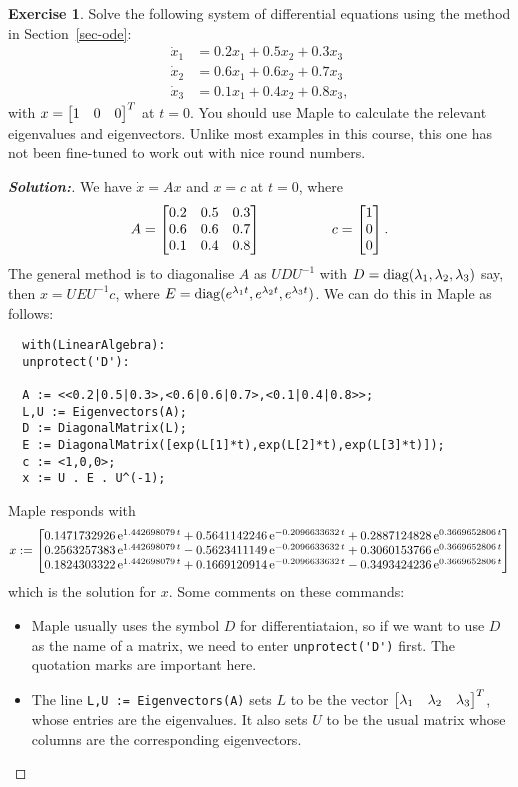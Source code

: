 \documentclass[a4paper]{amsart}
\theoremstyle{definition}
\newtheorem{exercise}{Exercise}
\newenvironment{solution}{\begin{proof}[\textbf{Solution:}] \vphantom{u}}{\end{proof}}
\begin{document}
\begin{exercise}\label{ex-ode-i}
 Solve the following system of differential equations using the method
 in Section~\ref{sec-ode}:
 \begin{align*}
  \dot{x}_1 &= 0.2 x_1 + 0.5 x_2 + 0.3 x_3 \\
  \dot{x}_2 &= 0.6 x_1 + 0.6 x_2 + 0.7 x_3 \\
  \dot{x}_3 &= 0.1 x_1 + 0.4 x_2 + 0.8 x_3,
 \end{align*}
 with $x=\left[\begin{matrix} 1 & 0 & 0 \end{matrix}\right]^T$ at $t=0$.  You should use Maple to
 calculate the relevant eigenvalues and eigenvectors.  Unlike most
 examples in this course, this one has not been fine-tuned to work out
 with nice round numbers.
\end{exercise}
\begin{solution}
 We have $\dot{x}=Ax$ and $x=c$ at $t=0$, where 
 \[ A = \left[\begin{matrix} 0.2 & 0.5 & 0.3 \\
             0.6 & 0.6 & 0.7 \\
             0.1 & 0.4 & 0.8 \end{matrix}\right] 
    \hspace{5em}
    c = \left[\begin{matrix} 1 \\ 0 \\ 0 \end{matrix}\right].
 \]
 The general method is to diagonalise $A$ as $UDU^{-1}$ with
 $D=\operatorname{diag}(\lambda_1,\lambda_2,\lambda_3)$ say, then $x=UEU^{-1}c$, where
 $E=\operatorname{diag}(e^{\lambda_1 t},e^{\lambda_2 t},e^{\lambda_3 t})$.  We can do this in
 Maple as follows:
 \begin{verbatim}
  with(LinearAlgebra):
  unprotect('D'):

  A := <<0.2|0.5|0.3>,<0.6|0.6|0.7>,<0.1|0.4|0.8>>;
  L,U := Eigenvectors(A);
  D := DiagonalMatrix(L);
  E := DiagonalMatrix([exp(L[1]*t),exp(L[2]*t),exp(L[3]*t)]);
  c := <1,0,0>;
  x := U . E . U^(-1);
 \end{verbatim}
 Maple responds with 
 \[ x := 
     \left[\begin{matrix} 
      0.1471732926\,{{\rm e}^{ 1.442698079\,t}}+
      0.5641142246\,{{\rm e}^{-0.2096633632\,t}}+ 
      0.2887124828\,{{\rm e}^{ 0.3669652806\,t}} \\ 
      0.2563257383\,{{\rm e}^{ 1.442698079\,t}}
    - 0.5623411149\,{{\rm e}^{-0.2096633632\,t}} +
      0.3060153766\,{{\rm e}^{ 0.3669652806\,t}}\\
      0.1824303322\,{{\rm e}^{ 1.442698079\,t}}+
      0.1669120914\,{{\rm e}^{-0.2096633632\,t}}
    - 0.3493424236\,{{\rm e}^{ 0.3669652806\,t}}
     \end{matrix}\right]
 \]
 which is the solution for $x$.  Some comments on these commands:
 \begin{itemize}
  \item Maple usually uses the symbol $D$ for differentiataion, so if
   we want to use $D$ as the name of a matrix, we need to enter
   \verb+unprotect('D')+ first.  The quotation marks are important
   here.
  \item The line \verb+L,U := Eigenvectors(A)+ sets $L$ to be the
   vector $\left[\begin{matrix} \lambda_1 & \lambda_2 & \lambda_3\end{matrix}\right]^T$, whose entries are the
   eigenvalues.  It also sets $U$ to be the usual matrix whose columns
   are the corresponding eigenvectors.
 \end{itemize}
\end{solution}
\end{document}
